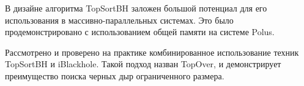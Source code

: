 \documentclass[12pt,a4paper,oneside,openany]{article}
\theoremstyle{definition}
\theoremstyle{lemma}
\theoremstyle{remark}
\begin{document}
В дизайне алгоритма TopSortBH заложен большой потенциал для его использования в
массивно-параллельных системах. Это было продемонстрировано с использованием общей памяти на системе Polus.

Рассмотрено и проверено на практике комбинированное использование техник TopSortBH и iBlackhole. Такой подход назван TopOver,
и демонстрирует преимущество поиска черных дыр ограниченного размера.

%
%
\newpage


\end{document}
